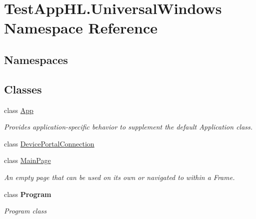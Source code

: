 \hypertarget{namespace_test_app_h_l_1_1_universal_windows}{}\section{Test\+App\+H\+L.\+Universal\+Windows Namespace Reference}
\label{namespace_test_app_h_l_1_1_universal_windows}
\subsection*{Namespaces}
\begin{DoxyCompactItemize}
\end{DoxyCompactItemize}
\subsection*{Classes}
\begin{DoxyCompactItemize}
\item 
class \hyperlink{class_test_app_h_l_1_1_universal_windows_1_1_app}{App}
\begin{DoxyCompactList}\small\item\em Provides application-\/specific behavior to supplement the default Application class. \end{DoxyCompactList}\item 
class \hyperlink{class_test_app_h_l_1_1_universal_windows_1_1_device_portal_connection}{Device\+Portal\+Connection}
\item 
class \hyperlink{class_test_app_h_l_1_1_universal_windows_1_1_main_page}{Main\+Page}
\begin{DoxyCompactList}\small\item\em An empty page that can be used on its own or navigated to within a Frame. \end{DoxyCompactList}\item 
class {\bfseries Program}
\begin{DoxyCompactList}\small\item\em Program class \end{DoxyCompactList}\end{DoxyCompactItemize}
